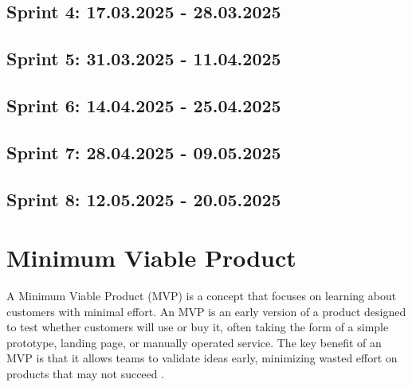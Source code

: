 \subsection{Sprint 4: 17.03.2025 - 28.03.2025}

\subsection{Sprint 5: 31.03.2025 - 11.04.2025}

\subsection{Sprint 6: 14.04.2025 - 25.04.2025}

\subsection{Sprint 7: 28.04.2025 - 09.05.2025}

\subsection{Sprint 8: 12.05.2025 - 20.05.2025}

\section{Minimum Viable Product}
A Minimum Viable Product (MVP) is a concept that focuses on learning about customers with minimal effort. An MVP is an early version of a product designed to test whether customers will use or buy it, often taking the form of a simple prototype, landing page, or manually operated service. The key benefit of an MVP is that it allows teams to validate ideas early, minimizing wasted effort on products that may not succeed \cite{agile_alliance_mvp}. 

